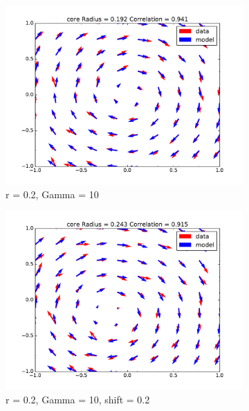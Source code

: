 \documentclass[12pt, a4paper, openany]{memoir}
\begin{document}
\begin{figure}[h!]
	\centering
	\begin{subfigure}[b]{0.45\textwidth}
		\centering
		\includegraphics[trim=40 20 40 20 ,clip, width=\textwidth]{figure/test_02_10N.pdf}
		\caption{r = 0.2, Gamma = 10}
	\end{subfigure}
	\begin{subfigure}[b]{0.45\textwidth}
		\centering
		\includegraphics[trim=40 20 40 20 ,clip, width=\textwidth]{figure/test_02_10_02N.pdf}
		\caption{r = 0.2, Gamma = 10, shift = 0.2}
	\end{subfigure}
	\begin{subfigure}[b]{0.45\textwidth}
		\centering

\end{subfigure}
\end{figure}
\end{document}

